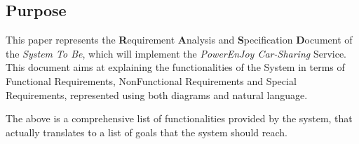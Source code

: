 \subsection{Purpose}
This paper represents the \textbf{R}equirement \textbf{A}nalysis and \textbf{S}pecification \textbf{D}ocument of the \textit{System To Be}, which will implement the \emph{PowerEnJoy Car-Sharing} Service. This document aims at explaining the functionalities of the System in terms of Functional Requirements, NonFunctional Requirements and Special Requirements, represented using both diagrams and natural language.

The above is a comprehensive list of functionalities provided by the system, that actually translates to a list of goals that the system should reach.

